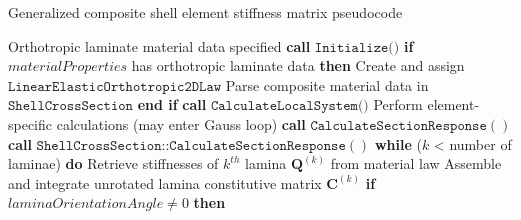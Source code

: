 \begin{algorithm}
	\onehalfspacing
	\caption{Generalized composite shell element stiffness matrix pseudocode}\label{general composite shell pseudocode}
	\begin{algorithmic}[1]
		\Require Orthotropic laminate material data specified
		\State \textbf{call} $\texttt{Initialize()}$
		\State \hspace{\algorithmicindent}\textbf{if} $materialProperties$ has orthotropic laminate data \textbf{then}
		\State \hspace{\algorithmicindent} \hspace{\algorithmicindent} Create and assign $\texttt{LinearElasticOrthotropic2DLaw}$
		\State \hspace{\algorithmicindent} \hspace{\algorithmicindent} Parse composite material data in $\texttt{ShellCrossSection}$
		\State \hspace{\algorithmicindent}\textbf{end if}
		\State \textbf{call} $\texttt{CalculateLocalSystem()}$
		\State \hspace{\algorithmicindent}Perform element-specific calculations (may enter Gauss loop)
		\State \hspace{\algorithmicindent}\textbf{call} $\texttt{CalculateSectionResponse}()$
		\State \hspace{\algorithmicindent}\hspace{\algorithmicindent} \textbf{call} $\texttt{ShellCrossSection::CalculateSectionResponse}()$
		\State \hspace{\algorithmicindent} \hspace{\algorithmicindent} \hspace{\algorithmicindent} \textbf{while} ($k$ < number of laminae) \textbf{do}
		\State \hspace{\algorithmicindent} \hspace{\algorithmicindent} \hspace{\algorithmicindent} \hspace{\algorithmicindent}Retrieve stiffnesses of $k^{th}$ lamina $\mathbf{Q}^{(k)}$ from material law
		\State \hspace{\algorithmicindent} \hspace{\algorithmicindent} \hspace{\algorithmicindent} \hspace{\algorithmicindent}Assemble and integrate unrotated lamina constitutive matrix $\mathbf{C}^{(k)}$
		\State \hspace{\algorithmicindent} \hspace{\algorithmicindent} \hspace{\algorithmicindent} \hspace{\algorithmicindent}\textbf{if} $laminaOrientationAngle \neq 0$ \textbf{then}

\end{algorithmic}
\end{algorithm}
